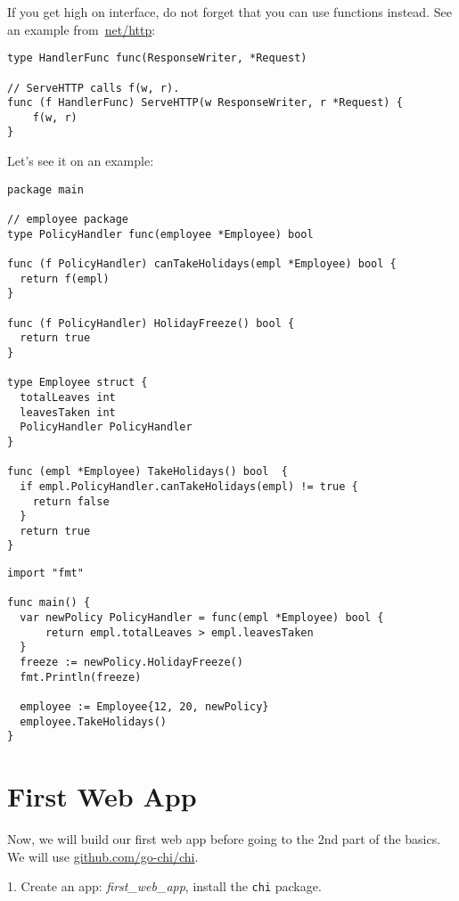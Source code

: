 \documentclass[11pt, letterpaper]{article}
\begin{document}
If you get high on interface, do not forget that you can use functions instead. See an example from~\href{https://golang.org/src/net/http/server.go}{net/http}:

\begin{verbatim}
type HandlerFunc func(ResponseWriter, *Request)

// ServeHTTP calls f(w, r).
func (f HandlerFunc) ServeHTTP(w ResponseWriter, r *Request) {
    f(w, r)
}
\end{verbatim}

Let's see it on an example:

\begin{verbatim}
package main

// employee package
type PolicyHandler func(employee *Employee) bool

func (f PolicyHandler) canTakeHolidays(empl *Employee) bool {
  return f(empl)
}

func (f PolicyHandler) HolidayFreeze() bool {
  return true
}

type Employee struct {
  totalLeaves int
  leavesTaken int
  PolicyHandler PolicyHandler
}

func (empl *Employee) TakeHolidays() bool  {
  if empl.PolicyHandler.canTakeHolidays(empl) != true {
    return false
  }
  return true
}
\end{verbatim}

\begin{verbatim}
import "fmt"

func main() {
  var newPolicy PolicyHandler = func(empl *Employee) bool {
      return empl.totalLeaves > empl.leavesTaken
  }
  freeze := newPolicy.HolidayFreeze()
  fmt.Println(freeze)

  employee := Employee{12, 20, newPolicy}
  employee.TakeHolidays()
}
\end{verbatim}

\pagebreak

\section{First Web App}

Now, we will build our first web app before going to the 2nd part of the basics. We will use \href{https://github.com/go-chi/chi}{github.com/go-chi/chi}.

\bigskip

1. Create an app: \emph{first\_web\_app}, install the \verb|chi| package.
\end{document}
